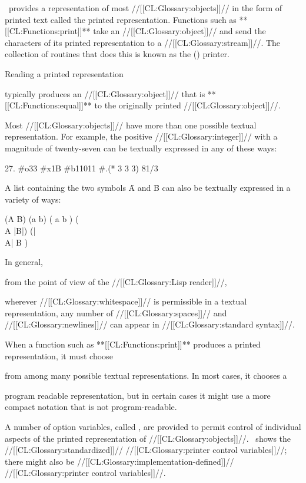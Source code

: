 


\clisp\ provides a representation of most //[[CL:Glossary:objects]]// in the form  of printed text called the printed representation. Functions such as **[[CL:Functions:print]]** take an //[[CL:Glossary:object]]//  and send the characters of its printed representation to a //[[CL:Glossary:stream]]//.  The collection of routines that does this is known as the (\clisp) printer.  

Reading a printed representation 

typically produces an //[[CL:Glossary:object]]// that is **[[CL:Functions:equal]]** to the originally printed //[[CL:Glossary:object]]//.


Most //[[CL:Glossary:objects]]// have more than one possible textual representation. For example, the positive //[[CL:Glossary:integer]]// with a magnitude of twenty-seven can be textually expressed in any of these ways:

    27.    #o33    #x1B    #b11011    #.(* 3 3 3)    81/3 \endcode

A list containing the two symbols \f{A} and \f{B} can also be textually expressed in a variety of ways:

\code
 (A B)    (a b)    (  a  b )    (\\A |B|)  (|\\A|
  B ) \endcode

In general, 

from the point of view of the //[[CL:Glossary:Lisp reader]]//,

wherever //[[CL:Glossary:whitespace]]// is permissible in a textual representation, any number of //[[CL:Glossary:spaces]]// and //[[CL:Glossary:newlines]]// can appear in //[[CL:Glossary:standard syntax]]//.

When a function such as **[[CL:Functions:print]]** produces a printed representation, it must choose 

from among many possible textual representations. In most cases, it chooses a 

program readable representation, but in certain cases it might use a more compact notation that is not  program-readable.

A number of option variables, called , are provided to permit control of individual aspects of the  printed representation of //[[CL:Glossary:objects]]//. \Thenextfigure\ shows the //[[CL:Glossary:standardized]]// //[[CL:Glossary:printer control variables]]//; there might also be //[[CL:Glossary:implementation-defined]]// //[[CL:Glossary:printer control variables]]//.

